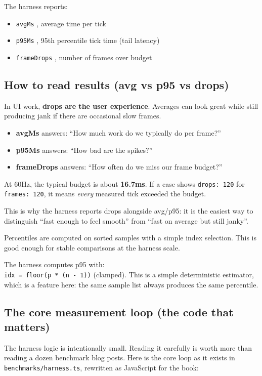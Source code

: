 The harness reports:

\begin{itemize}
\item \texttt{avgMs} , average time per tick
\item \texttt{p95Ms} , 95th percentile tick time (tail latency)
\item \texttt{frameDrops} , number of frames over budget
\end{itemize}

\subsection{How to read results (avg vs p95 vs drops)}

In UI work, \textbf{drops are the user experience}.
Averages can look great while still producing jank if there are occasional slow frames.

\begin{itemize}
\item \textbf{avgMs} answers: ``How much work do we typically do per frame?''
\item \textbf{p95Ms} answers: ``How bad are the spikes?''
\item \textbf{frameDrops} answers: ``How often do we miss our frame budget?''
\end{itemize}

At 60Hz, the typical budget is about \textbf{16.7ms}.
If a case shows \texttt{drops: 120} for \texttt{frames: 120}, it means \emph{every} measured tick exceeded the budget.

This is why the harness reports drops alongside avg/p95: it is the easiest way to distinguish ``fast enough to feel smooth'' from ``fast on average but still janky''.

Percentiles are computed on sorted samples with a simple index selection.
This is good enough for stable comparisons at the harness scale.

The harness computes p95 with:\\
	\texttt{idx = floor(p * (n - 1))} (clamped).
This is a simple deterministic estimator, which is a feature here: the same sample list always produces the same percentile.

\subsection{The core measurement loop (the code that matters)}

The harness logic is intentionally small.
Reading it carefully is worth more than reading a dozen benchmark blog posts.
Here is the core loop as it exists in \texttt{benchmarks/harness.ts}, rewritten as JavaScript for the book:

